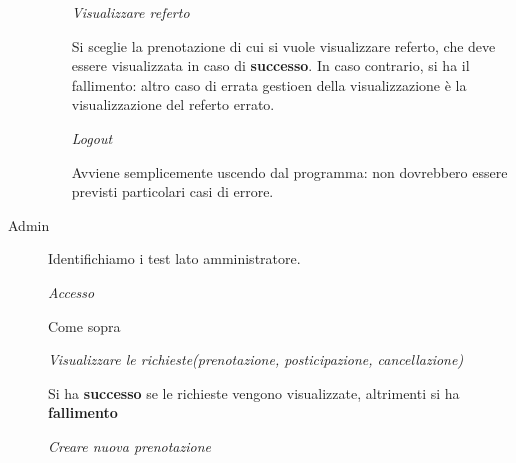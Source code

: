 \begin{description}
\begin{itemize}
                                                                                                                                   

 \diam \textit{Visualizzare referto}


  Si sceglie la  prenotazione di cui si vuole visualizzare referto, che deve
  essere visualizzata in caso di \textbf{successo}. In caso contrario, si ha il
  fallimento: altro caso di errata gestioen della visualizzazione è la visualizzazione
  del referto errato.

                                                                                                                                   

 \diam \textit{Logout}

 Avviene semplicemente uscendo dal programma: non dovrebbero essere previsti
 particolari casi di errore.
\end{itemize}

                                                                                                                                   
                                                                                                                                   
                                                                                                                                   

\item[Admin]

Identifichiamo i test lato amministratore.

                                                                                                                                   
\begin{itemize}
\diam \textit{Accesso}

  Come sopra

                                                                                                                                   

\diam \textit{Visualizzare le richieste(prenotazione, posticipazione, cancellazione)}

  Si ha \textbf{successo} se le richieste vengono visualizzate, altrimenti si ha
  \textbf{fallimento}
                                                                                                                                   

\diam \textit{Creare nuova prenotazione}


\end{itemize}
\end{description}
